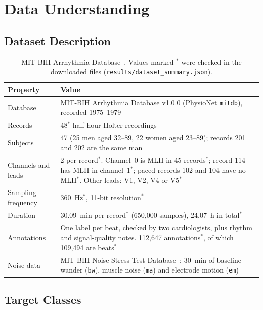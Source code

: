 \documentclass[11pt,a4paper]{article}
\newcommand{\code}[1]{\texttt{#1}}
\begin{document}
\section{Data Understanding}

\subsection{Dataset Description}

\begin{table}[H]
\centering
\small
\caption{MIT-BIH Arrhythmia Database~\citep{moody2001impact,goldberger2000physionet,physionet_mitdb}. Values marked $^{*}$ were checked in the downloaded files (\code{results/dataset\_summary.json}).}
\label{tab:dataset}
\begin{tabularx}{\textwidth}{@{} l L @{}}
\toprule
Property & Value \\
\midrule
Database & MIT-BIH Arrhythmia Database v1.0.0 (PhysioNet \code{mitdb}), recorded 1975--1979 \\
Records & 48$^{*}$ half-hour Holter recordings \\
Subjects & 47 (25 men aged 32--89, 22 women aged 23--89); records 201 and 202 are the same man \\
Channels and leads & 2 per record$^{*}$. Channel~0 is MLII in 45 records$^{*}$; record 114 has MLII in channel~1$^{*}$; paced records 102 and 104 have no MLII$^{*}$. Other leads: V1, V2, V4 or V5$^{*}$ \\
Sampling frequency & 360~Hz$^{*}$, 11-bit resolution$^{*}$ \\
Duration & 30.09~min per record$^{*}$ (650,000 samples), 24.07~h in total$^{*}$ \\
Annotations & One label per beat, checked by two cardiologists, plus rhythm and signal-quality notes. 112,647 annotations$^{*}$, of which 109,494 are beats$^{*}$ \\
Noise data & MIT-BIH Noise Stress Test Database~\citep{moody1984noise,physionet_nstdb}: 30~min of baseline wander (\code{bw}), muscle noise (\code{ma}) and electrode motion (\code{em}) \\
\bottomrule
\end{tabularx}
\end{table}

\subsection{Target Classes}
\end{document}
